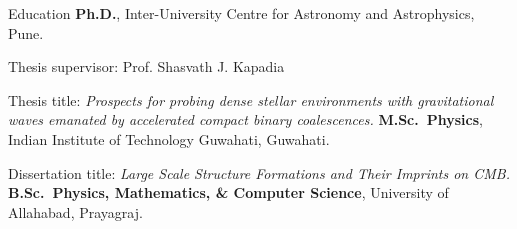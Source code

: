 \begin{rubric}{Education}
\entry*[2021 -- Present]%
	\textbf{Ph.D.}, Inter-University Centre for Astronomy and Astrophysics, Pune.
	\par Thesis supervisor: Prof. Shasvath J. Kapadia
	\par Thesis title: \emph{Prospects for probing dense stellar environments with gravitational waves emanated by accelerated compact binary coalescences.}
%
\entry*[2019 -- 2021]%
	\textbf{M.Sc.~Physics}, Indian Institute of Technology Guwahati, Guwahati.
	\par Dissertation title: \emph{Large Scale Structure Formations and Their Imprints on CMB.}
% 
\entry*[2016 -- 2019]%
	\textbf{B.Sc.~Physics, Mathematics, \& Computer Science}, University of Allahabad, Prayagraj.
\end{rubric}
